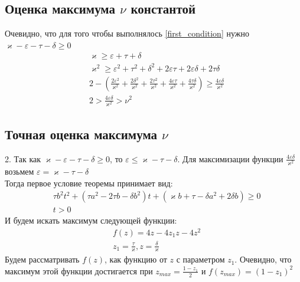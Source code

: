 \documentclass[a4paper]{article}
\begin{document}
\subsection{Оценка максимума $\nu$ константой}
Очевидно, что для того чтобы выполнялось \ref{first_condition} нужно  $\varkappa - \varepsilon - \tau - \delta \geq 0$
\begin{equation}\label{first_condition}
 \begin{aligned}
&\varkappa \geq \varepsilon+\tau+\delta \\
&\varkappa^2 \geq \varepsilon^2 + \tau^2 + \delta^2 + 2\varepsilon\tau + 2\varepsilon\delta + 2\tau\delta\\
&2 -(\frac{2\varepsilon^2}{\varkappa^2} + \frac{2\delta^2}{\varkappa^2} + \frac{2\tau^2}{\varkappa^2} +\frac{4\varepsilon\tau}{\varkappa^2} + \frac{4\tau\delta}{\varkappa^2}) \geq \frac{4\varepsilon\delta}{\varkappa^2}\\
&2 > \frac{4\varepsilon\delta}{\varkappa^2} > \nu^2
 \end{aligned}
\end{equation}

\subsection{Точная оценка максимума $\nu$}
2. Так как $\varkappa - \varepsilon - \tau - \delta \geq 0$, то $ \varepsilon \leq \varkappa - \tau - \delta$. Для максимизации функции $\frac{4\varepsilon\delta}{\varkappa^2}$ возьмем $\varepsilon = \varkappa - \tau - \delta$\\
Тогда первое условие теоремы принимает вид:
\begin{equation}\label{ineq1} 
 \begin{aligned}
&\tau b^2t^2 + (\tau a^2-2 \tau b - \delta b^2)t + (\varkappa b+\tau-\delta a^2 + 2\delta b) \geq 0\\
&t > 0
 \end{aligned}
\end{equation}
И будем искать максимум следующей функции: 
\begin{equation}
 \begin{aligned}
&f(z) = 4z-4z_1z - 4z^2\\
&z_1 = \frac{\tau}{\varkappa}, z = \frac{\delta}{\varkappa}
 \end{aligned}
\end{equation} 
Будем рассматривать $f(z)$, как функцию от $z$ с параметром $z_1$. Очевидно, что максимум этой функции достигается при $z_{max} = \frac{1-z_1}{2}$ и $f(z_{max}) = (1-z_1)^2$\\
\end{document}
